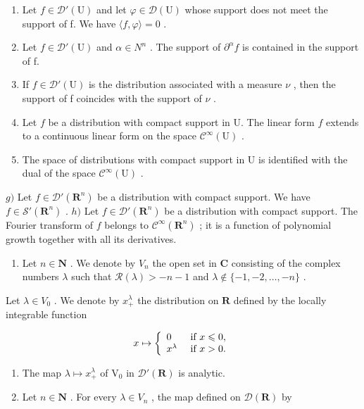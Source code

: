 \begin{enumerate}
\def\labelenumi{\alph{enumi})}
\setcounter{enumi}{1}
\item
  Let \(f \in \mathcal{D}'(\mathrm{U})\) and let \(\varphi \in \mathcal{D}(\mathrm{U})\) whose support does not meet the support of f. We have \(\langle f, \varphi \rangle = 0\) .
\item
  Let \(f \in \mathcal{D}'(\mathrm{U})\) and \(\alpha \in N^{n}\) . The support of \(\partial^{\alpha}f\) is contained in the support of f.
\item
  If \(f \in \mathcal{D}'(\mathrm{U})\) is the distribution associated with a measure \(\nu\) , then the support of f coincides with the support of \(\nu\) .
\item
  Let \(f\) be a distribution with compact support in U. The linear form \(f\) extends to a continuous linear form on the space \(\mathcal{C}^{\infty}(\mathrm{U})\) .
\item
  The space of distributions with compact support in U is identified with the dual of the space \(\mathcal{C}^{\infty}(\mathrm{U})\) .
\end{enumerate}

\(g)\) Let \(f \in \mathcal{D}'(\mathbf{R}^n)\) be a distribution with compact support. We have \(f \in \mathcal{S}'(\mathbf{R}^n)\) . \(h)\) Let \(f \in \mathcal{D}'(\mathbf{R}^n)\) be a distribution with compact support. The Fourier transform of \(f\) belongs to \(\mathcal{C}^\infty(\mathbf{R}^n)\) ; it is a function of polynomial growth together with all its derivatives.

\begin{enumerate}
\def\labelenumi{\arabic{enumi})}
\setcounter{enumi}{19}
\tightlist
\item
  Let \(n \in \mathbf{N}\) . We denote by \(V_n\) the open set in \(\mathbf{C}\) consisting of the complex numbers \(\lambda\) such that \(\mathcal{R}(\lambda) > -n - 1\) and \(\lambda \notin \{-1, -2, \ldots, -n\}\) .
\end{enumerate}

Let \(\lambda\in V_{0}\) . We denote by \(x_{+}^{\lambda}\) the distribution on \(\mathbf{R}\) defined by the locally integrable function

\[
x \mapsto \left\{ \begin{array}{l l} 0 & \text { if } x \leqslant 0, \\ x ^ {\lambda} & \text { if } x > 0. \end{array} \right.
\]

\begin{enumerate}
\def\labelenumi{\alph{enumi})}
\item
  The map \(\lambda \mapsto x_{+}^{\lambda}\) of \(\mathrm{V}_0\) in \(\mathcal{D}'(\mathbf{R})\) is analytic.
\item
  Let \(n \in \mathbf{N}\) . For every \(\lambda \in V_n\) , the map defined on \(\mathcal{D}(\mathbf{R})\) by
\end{enumerate}

